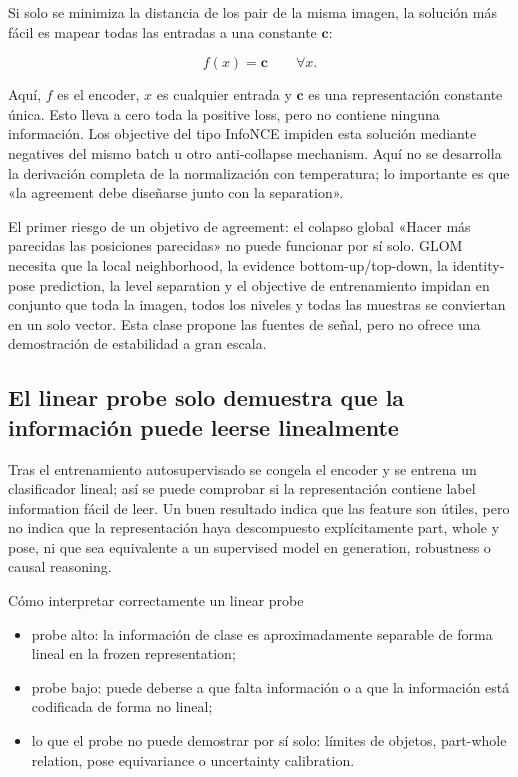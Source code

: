 Si solo se minimiza la distancia de los pair de la misma imagen, la solución más fácil es mapear todas las entradas a una constante $\mathbf c$:

\[
f(x)=\mathbf c\qquad \forall x.
\]

Aquí, $f$ es el encoder, $x$ es cualquier entrada y $\mathbf c$ es una representación constante única. Esto lleva a cero toda la positive loss, pero no contiene ninguna información. Los objective del tipo InfoNCE impiden esta solución mediante negatives del mismo batch u otro anti-collapse mechanism. Aquí no se desarrolla la derivación completa de la normalización con temperatura; lo importante es que «la agreement debe diseñarse junto con la separation».

\begin{warningbox}{El primer riesgo de un objetivo de agreement: el colapso global}
«Hacer más parecidas las posiciones parecidas» no puede funcionar por sí solo. GLOM necesita que la local neighborhood, la evidence bottom-up/top-down, la identity-pose prediction, la level separation y el objective de entrenamiento impidan en conjunto que toda la imagen, todos los niveles y todas las muestras se conviertan en un solo vector. Esta clase propone las fuentes de señal, pero no ofrece una demostración de estabilidad a gran escala.
\end{warningbox}

\subsection{El linear probe solo demuestra que la información puede leerse linealmente}

Tras el entrenamiento autosupervisado se congela el encoder y se entrena un clasificador lineal; así se puede comprobar si la representación contiene label information fácil de leer. Un buen resultado indica que las feature son útiles, pero no indica que la representación haya descompuesto explícitamente part, whole y pose, ni que sea equivalente a un supervised model en generation, robustness o causal reasoning.


\begin{knowledgebox}{Cómo interpretar correctamente un linear probe}
\begin{itemize}
  \item probe alto: la información de clase es aproximadamente separable de forma lineal en la frozen representation;
  \item probe bajo: puede deberse a que falta información o a que la información está codificada de forma no lineal;
  \item lo que el probe no puede demostrar por sí solo: límites de objetos, part-whole relation, pose equivariance o uncertainty calibration.
\end{itemize}
\end{knowledgebox}

